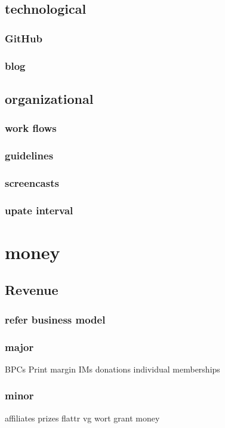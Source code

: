 \documentclass[output=guidelines,guidelines] {langscibook}
\begin{document}
\subsection{technological}
\subsubsection{GitHub}
\subsubsection{blog}
\subsection{organizational}
\subsubsection{work flows}
\subsubsection{guidelines}
\subsubsection{screencasts}
\subsubsection{upate interval}
\section{money}
\subsection{Revenue}
\subsubsection{refer business model}
\subsubsection{major}
                    BPCs
                    Print margin
                    IMs
                    donations
                    individual memberships
\subsubsection{minor}
                    affiliates
                    prizes
                    flattr
                    vg wort
                    grant money
\end{document}
